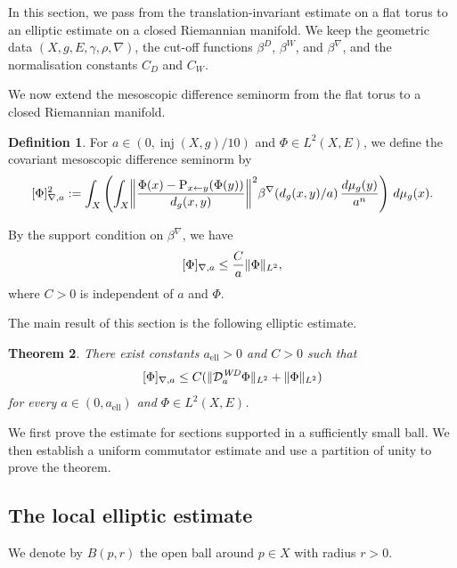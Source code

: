 \documentclass[a4paper,oneside,12pt]{amsart}
\theoremstyle{plain}
\newtheorem{theorem}{Theorem}[section]
\theoremstyle{definition}
\newtheorem{definition}[theorem]{Definition}
\theoremstyle{remark}
\DeclarePairedDelimiter{\norm}{\lVert}{\rVert}
\DeclarePairedDelimiter{\seminorm}{\lbrack}{\rbrack}
\DeclareMathOperator{\injectivityradius}{inj}
\newcommand{\dvol}{d\mu}
\newcommand{\paralleltransport}[2]{\operatorname{P}_{#2 \gets #1}}
\newcommand{\cliffordmultiplication}{\rho}
\newcommand{\Ltwonorm}[2][L^2]{\norm{#2}_{#1}}
\newcommand{\mesoscopicdifferenceseminorm}[2][a]{\seminorm{#2}_{\nabla,#1}}
\newcommand{\mesoscopicWilsonDiracoperator}[1][a]{\mathcal{D}_{#1}^{\mathit{WD}}}
\newcommand{\cutoff}{\beta}
\newcommand{\cutoffDirac}{\cutoff^D}
\newcommand{\cutoffWilson}{\cutoff^W}
\newcommand{\cutoffnabla}{\cutoff^{\nabla}}
\newcommand{\constantAell}{a_{\mathrm{ell}}}
\begin{document}
In this section, we pass from the translation-invariant estimate on a flat torus to an elliptic estimate on a closed Riemannian manifold.
We keep the geometric data $(X,g,E,\gamma,\cliffordmultiplication,\nabla)$, the cut-off functions $\cutoffDirac$, $\cutoffWilson$, and $\cutoffnabla$, and the normalisation constants $C_D$ and $C_W$.

We now extend the mesoscopic difference seminorm from the flat torus to a closed Riemannian manifold.
\begin{definition}\label{definition: mesoscopic difference seminorm on manifolds}
  For $a \in (0,\injectivityradius(X,g)/10)$ and $\Phi \in L^2(X,E)$, we define the covariant mesoscopic difference seminorm by
  \begin{equation}
    \mesoscopicdifferenceseminorm{\Phi}^2 := \int_X \left(\int_X \norm*{\frac{\Phi(x) - \paralleltransport{y}{x}(\Phi(y))}{d_g(x,y)}}^2 \cutoffnabla(d_g(x,y)/a) \,\frac{\dvol_g(y)}{a^n}\right) \,\dvol_g(x).
  \end{equation}
\end{definition}
By the support condition on $\cutoffnabla$, we have
\begin{equation}
  \mesoscopicdifferenceseminorm{\Phi} \le \frac{C}{a} \Ltwonorm{\Phi},
\end{equation}
where $C > 0$ is independent of $a$ and $\Phi$.

The main result of this section is the following elliptic estimate.
\begin{theorem}\label{theorem: global elliptic estimate}
  There exist constants $\constantAell > 0$ and $C > 0$ such that
  \begin{equation}
    \mesoscopicdifferenceseminorm{\Phi} \le C (\Ltwonorm{\mesoscopicWilsonDiracoperator \Phi} + \Ltwonorm{\Phi})
  \end{equation}
  for every $a \in (0,\constantAell)$ and $\Phi \in L^2(X,E)$.
\end{theorem}

We first prove the estimate for sections supported in a sufficiently small ball.
We then establish a uniform commutator estimate and use a partition of unity to prove the theorem.

\subsection{The local elliptic estimate}

We denote by $B(p,r)$ the open ball around $p \in X$ with radius $r > 0$.
\end{document}
